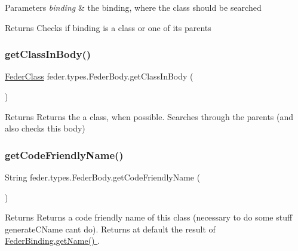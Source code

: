 \begin{DoxyParams}{Parameters}
{\em binding} & the binding, where the class should be searched \\
\hline
\end{DoxyParams}
\begin{DoxyReturn}{Returns}
Checks if \textquotesingle{}binding\textquotesingle{} is a class or one of its parents 
\end{DoxyReturn}
\mbox{\label{classfeder_1_1types_1_1FederBody_a31c99a87dddae5d4e5b5d1a7bc0af98f}} 
\subsubsection{\texorpdfstring{get\+Class\+In\+Body()}{getClassInBody()}}
{\footnotesize\ttfamily \hyperlink{classfeder_1_1types_1_1FederClass}{Feder\+Class} feder.\+types.\+Feder\+Body.\+get\+Class\+In\+Body (\begin{DoxyParamCaption}{ }\end{DoxyParamCaption})}

\begin{DoxyReturn}{Returns}
Returns the a class, when possible. Searches through the parents (and also checks this body) 
\end{DoxyReturn}
\mbox{\label{classfeder_1_1types_1_1FederBody_a8d37894b7118c7cd28dc840703b69fed}} 
\subsubsection{\texorpdfstring{get\+Code\+Friendly\+Name()}{getCodeFriendlyName()}}
{\footnotesize\ttfamily String feder.\+types.\+Feder\+Body.\+get\+Code\+Friendly\+Name (\begin{DoxyParamCaption}{ }\end{DoxyParamCaption})}

\begin{DoxyReturn}{Returns}
Returns a code friendly name of this class (necessary to do some stuff generate\+C\+Name can\textquotesingle{}t do). Returns at default the result of \hyperlink{classfeder_1_1types_1_1FederBinding_ab233b4eb1c5fef826e01cfe610447cea}{Feder\+Binding.\+get\+Name() }. 
\end{DoxyReturn}
\mbox{\label{classfeder_1_1types_1_1FederBody_a1b33bcff46a927796e956f6ded84764d}} 
